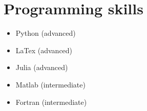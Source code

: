 \section*{Programming skills \quad\, }
\begin{minipage}[t]{0.5\linewidth}
\begin{itemize}
    \item Python (advanced)
    \item LaTex (advanced)
    \item Julia (advanced)
\end{itemize}
\end{minipage}\hfill
\begin{minipage}[t]{0.5\linewidth}
\begin{itemize}
    \item Matlab (intermediate)
    \item Fortran (intermediate)
\end{itemize}
\end{minipage}
